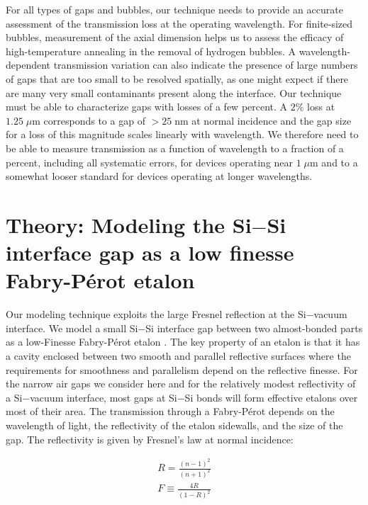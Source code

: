 \documentclass[osajnl,twocolumn,showpacs,superscriptaddress,11pt]{revtex4-1} %
\begin{document}
For all types of gaps and bubbles, our technique needs to provide an accurate assessment of the transmission loss at the operating wavelength.  For finite-sized bubbles, measurement of the axial dimension helps us to assess the efficacy of high-temperature annealing \cite{Horn2009, Masteika2014} in the removal of hydrogen bubbles.  A wavelength-dependent transmission variation can also indicate the presence of large numbers of gaps that are too small to be resolved spatially, as one might expect if there are many very small contaminants present along the interface.  Our technique must be able to characterize gaps with losses of a few percent.  A $2\%$ loss at $1.25\;\mu$m corresponds to a gap of $>25\;$nm at normal incidence and the gap size for a loss of this magnitude scales linearly with wavelength.  We therefore need to be able to measure transmission as a function of wavelength to a fraction of a percent, including all systematic errors, for devices operating near $1\;\mu$m and to a somewhat looser standard for devices operating at longer wavelengths.


\section{Theory: Modeling the Si$-$Si interface gap as a low finesse Fabry-P\'{e}rot etalon}
\label{secTheory}

Our modeling technique exploits the large Fresnel reflection \cite{2001opt4.book.....H} at the Si$-$vacuum interface.  We model a small Si$-$Si interface gap between two almost-bonded parts as a low-Finesse Fabry-P\'{e}rot etalon \cite{2007fuph.book.....S}.  The key property of an etalon is that it has a cavity enclosed between two smooth and parallel reflective surfaces where the requirements for smoothness and parallelism depend on the reflective finesse.  For the narrow air gaps we consider here and for the relatively modest reflectivity of a Si$-$vacuum interface, most gaps at Si$-$Si bonds will form effective etalons over most of their area.  The transmission through a Fabry-P\'{e}rot depends on the wavelength of light, the reflectivity of the etalon sidewalls, and the size of the gap.  The reflectivity is given by Fresnel's law at normal incidence:

\begin{eqnarray}
R = \frac{(n-1)^2}{(n+1)^2} \label{Eq:FresnelR}\\
F \equiv \frac{4R}{(1-R)^2} \label{Eq:coeffF}
\end{eqnarray}
\end{document}

